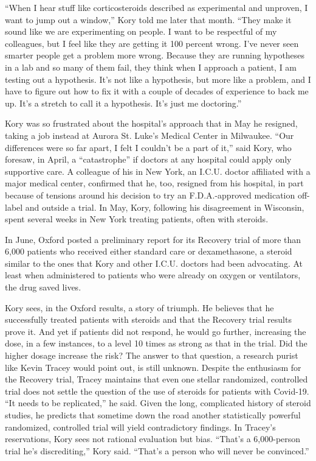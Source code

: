 ``When I hear stuff like corticosteroids described as experimental and
unproven, I want to jump out a window,'' Kory told me later that month.
``They make it sound like we are experimenting on people. I want to be
respectful of my colleagues, but I feel like they are getting it 100
percent wrong. I've never seen smarter people get a problem more wrong.
Because they are running hypotheses in a lab and so many of them fail,
they think when I approach a patient, I am testing out a hypothesis.
It's not like a hypothesis, but more like a problem, and I have to
figure out how to fix it with a couple of decades of experience to back
me up. It's a stretch to call it a hypothesis. It's just me doctoring.''

Kory was so frustrated about the hospital's approach that in May he
resigned, taking a job instead at Aurora St. Luke's Medical Center in
Milwaukee. ``Our differences were so far apart, I felt I couldn't be a
part of it,'' said Kory, who foresaw, in April, a ``catastrophe'' if
doctors at any hospital could apply only supportive care. A colleague of
his in New York, an I.C.U. doctor affiliated with a major medical
center, confirmed that he, too, resigned from his hospital, in part
because of tensions around his decision to try an F.D.A.-approved
medication off-label and outside a trial. In May, Kory, following his
disagreement in Wisconsin, spent several weeks in New York treating
patients, often with steroids.

In June, Oxford posted a preliminary report for its Recovery trial of
more than 6,000 patients who received either standard care or
dexamethasone, a steroid similar to the ones that Kory and other I.C.U.
doctors had been advocating. At least when administered to patients who
were already on oxygen or ventilators, the drug saved lives.

Kory sees, in the Oxford results, a story of triumph. He believes that
he successfully treated patients with steroids and that the Recovery
trial results prove it. And yet if patients did not respond, he would go
further, increasing the dose, in a few instances, to a level 10 times as
strong as that in the trial. Did the higher dosage increase the risk?
The answer to that question, a research purist like Kevin Tracey would
point out, is still unknown. Despite the enthusiasm for the Recovery
trial, Tracey maintains that even one stellar randomized, controlled
trial does not settle the question of the use of steroids for patients
with Covid-19. ``It needs to be replicated,'' he said. Given the long,
complicated history of steroid studies, he predicts that sometime down
the road another statistically powerful randomized, controlled trial
will yield contradictory findings. In Tracey's reservations, Kory sees
not rational evaluation but bias. ``That's a 6,000-person trial he's
discrediting,'' Kory said. ``That's a person who will never be
convinced.''

